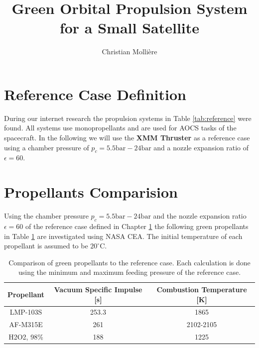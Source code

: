 \documentclass[12pt]{article}
\begin{document}
 
 
\title{Green Orbital Propulsion System for a Small Satellite}
\author{Christian Molli\`ere}
\maketitle

\section{Reference Case Definition}
\label{chap:reference_case}
During our internet research the propulsion systems in Table \ref{tab:reference} were found. All systems use monopropellants and are used for AOCS tasks of the spacecraft. In the following we will use the \textbf{XMM Thruster} as a reference case using a chamber pressure of $p_c=5.5\text{bar}-24\text{bar}$ and a nozzle expansion ratio of $\epsilon=60$.\\
 
\section{Propellants Comparision}
Using the chamber pressure $p_c=5.5\text{bar}-24\text{bar}$ and the nozzle expansion ratio $\epsilon=60$ of the reference case defined in Chapter \ref{chap:reference_case} the following green propellants in Table \ref{tab:comparison} are investigated using NASA CEA. The initial temperature of each propellant is assumed to be $20^\circ\text{C}$.

\begin{table}[h]
	\centering
	\caption{Comparison of green propellants to the reference case. Each calculation is done using the minimum and maximum feeding pressure of the reference case.}
	\begin{tabular}{|c|c|c|}
		\hline
		Propellant & Vacuum Specific Impulse {[}s{]} & Combustion Temperature {[}K{]} \\ \hline
		LMP-103S   & 253.3                         & 1865                      \\ \hline
		AF-M315E   & 261                         & 2102-2105                      \\ \hline
		H2O2, 98\% & 188                         & 1225                      \\ \hline     
	\end{tabular}
	\label{tab:comparison}
\end{table}
\end{document}
